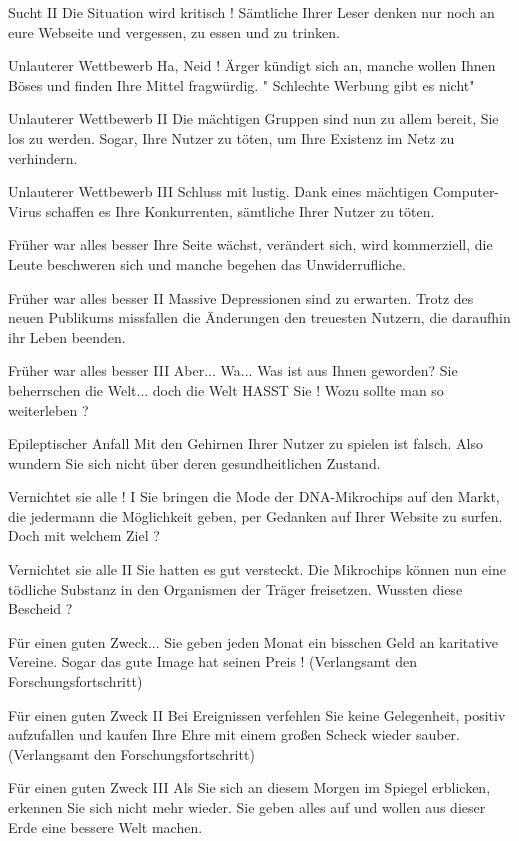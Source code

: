 Sucht II
Die Situation wird kritisch ! Sämtliche Ihrer Leser denken nur noch an eure Webseite und vergessen, zu essen und zu trinken.



Unlauterer Wettbewerb
Ha, Neid ! Ärger kündigt sich an, manche wollen Ihnen Böses und finden Ihre Mittel fragwürdig. " Schlechte Werbung gibt es nicht"

Unlauterer Wettbewerb II
Die mächtigen Gruppen sind nun zu allem bereit, Sie los zu werden. Sogar, Ihre Nutzer zu töten, um Ihre Existenz im Netz zu verhindern.

Unlauterer Wettbewerb III
Schluss mit lustig. Dank eines mächtigen Computer-Virus schaffen es Ihre Konkurrenten, sämtliche Ihrer Nutzer zu töten.


Früher war alles besser
Ihre Seite wächst, verändert sich, wird kommerziell, die Leute beschweren sich und manche begehen das Unwiderrufliche.

Früher war alles besser II
Massive Depressionen sind zu erwarten. Trotz des neuen Publikums missfallen die Änderungen den treuesten Nutzern, die daraufhin ihr Leben beenden.

Früher war alles besser III
Aber... Wa... Was ist aus Ihnen geworden? Sie beherrschen die Welt... doch die Welt HASST Sie ! Wozu sollte man so weiterleben ?



Epileptischer Anfall
Mit den Gehirnen Ihrer Nutzer zu spielen ist falsch. Also wundern Sie sich nicht über deren gesundheitlichen Zustand.



Vernichtet sie alle ! I
Sie bringen die Mode der DNA-Mikrochips auf den Markt, die jedermann die Möglichkeit geben, per Gedanken auf Ihrer Website zu surfen. Doch mit welchem Ziel ?

Vernichtet sie alle II
Sie hatten es gut versteckt. Die Mikrochips können nun eine tödliche Substanz in den Organismen der Träger freisetzen. Wussten diese Bescheid ?



Für einen guten Zweck...
Sie geben jeden Monat ein bisschen Geld an karitative Vereine. Sogar das gute Image hat seinen Preis ! (Verlangsamt den Forschungsfortschritt)

Für einen guten Zweck II
Bei Ereignissen verfehlen Sie keine Gelegenheit, positiv aufzufallen und kaufen Ihre Ehre mit einem großen Scheck wieder sauber. (Verlangsamt den Forschungsfortschritt)

Für einen guten Zweck III
Als Sie sich an diesem Morgen im Spiegel erblicken, erkennen Sie sich nicht mehr wieder. Sie geben alles auf und wollen aus dieser Erde eine bessere Welt machen.




